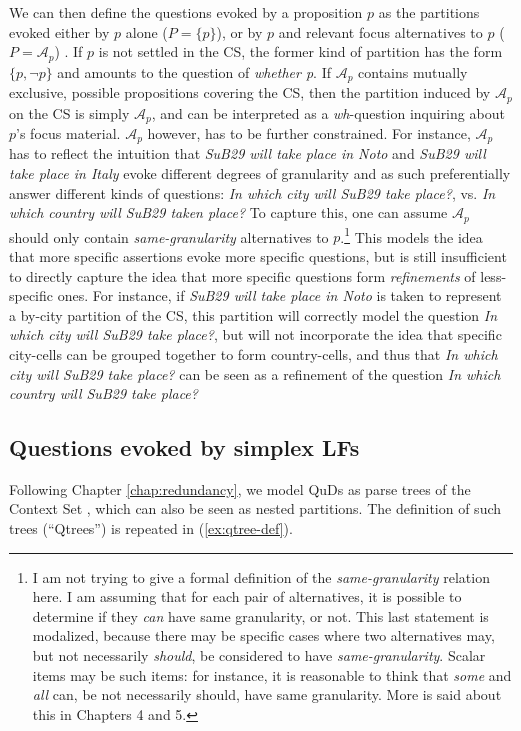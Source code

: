 We can then define the questions evoked by a proposition $p$ as the partitions evoked either by $p$ alone ($P=\lbrace p \rbrace$), or by $p$ and relevant focus alternatives to $p$ ($P=\mathcal{A}_p$) \citep{Rooth1992}. If $p$ is not settled in the CS, the former kind of partition has the form $\lbrace p, \neg p\rbrace$ and amounts to the question of \textit{whether p}. If $\mathcal{A}_p$ contains mutually exclusive, possible propositions covering the CS, then the partition induced by $\mathcal{A}_p$ on the CS is simply $\mathcal{A}_p$, and can be interpreted as a \textit{wh}-question inquiring about $p$'s focus material. $\mathcal{A}_p$ however, has to be further constrained. For instance, $\mathcal{A}_p$ has to reflect the intuition that \textit{SuB29 will take place in Noto} and \textit{SuB29 will take place in Italy} evoke different degrees of granularity and as such preferentially answer different kinds of questions: \textit{In which city will SuB29 take place?}, vs. \textit{In which country will SuB29 taken place?} To capture this, one can assume $\mathcal{A}_p$ should only contain \textit{same-granularity} alternatives to $p$.\footnote{I am not trying to give a formal definition of the \textit{same-granularity} relation here. I am assuming that for each pair of alternatives, it is possible to determine if they \textit{can} have same granularity, or not. This last statement is modalized, because there may be specific cases where two alternatives may, but not necessarily \textit{should}, be considered to have \textit{same-granularity}. Scalar items may be such items: for instance, it is reasonable to think that \textit{some} and \textit{all} can, be not necessarily should, have same granularity. More is said about this in Chapters 4 and 5.} This models the idea that more specific assertions evoke more specific questions, but is still insufficient to directly capture the idea that more specific questions form \textit{refinements} of less-specific ones. For instance, if \textit{SuB29 will take place in Noto} is taken to represent a by-city partition of the CS, this partition will correctly model the question \textit{In which city will SuB29 take place?}, but will not incorporate the idea that specific city-cells can be grouped together to form country-cells, and thus that \textit{In which city will SuB29 take place?} can be seen as a refinement of the question \textit{In which country will SuB29 take place?}

\subsection{Questions evoked by simplex LFs}\label{sec:simplex}
Following Chapter \ref{chap:redundancy}, we model QuDs as parse trees of the Context Set , which can also be seen as nested partitions. The definition of such trees (``Qtrees'') is repeated in (\ref{ex:qtree-def}).

